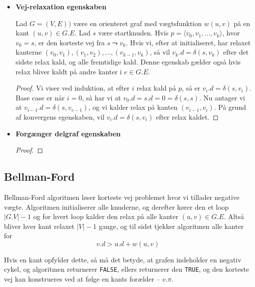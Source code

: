 \begin{itemize}
\item \textbf{Vej-relaxation egenskaben}
  \begin{lemma}
    Lad $G = (V,E))$ være en orienteret graf med vægtsfunktion $w(u,v)$ på en kant $(u,v) \in G.E$. Lad $s$ være startknuden. Hvis $p = \langle v_0, v_1, ..., v_k\rangle$, hvor $v_0 = s$, er den korteste vej fra $s \leadsto v_k$. Hvis vi, efter at initialiseret, har relaxet kanterne $(v_0, v_1), (v_1, v_2), ..., (v_{k-1}, v_k)$, så vil $v_k.d = \delta(s,v_k)$ efter det sidste relax kald, og alle fremtidige kald. Denne egenskab gælder også hvis relax bliver kaldt på andre kanter i $e \in G.E$.
  \end{lemma}

  \begin{proof}
    Vi viser ved induktion, at efter $i$ relax kald på $p$, så er $v_i.d = \delta(s,v_i)$.\\
    Base case er når $i=0$, så har vi at $v_0.d = s.d = 0 = \delta(s,s)$.
    Nu antager vi at $v_{i-1}.d = \delta(s, v_{v - 1})$, og vi kalder relax på kanten $(v_{i-1}, v_i)$. På grund af konvergens egenskaben, vil $v_i.d = \delta(s,v_i)$ efter relax kaldet.
  \end{proof}


\item\textbf{Forgænger delgraf egenskaben}
  \begin{lemma}
  \end{lemma}

  \begin{proof}
  \end{proof}

\end{itemize}

\subsection{Bellman-Ford}
Bellman-Ford algoritmen løser korteste vej problemet hvor vi tillader negative vægte. Algoritmen initialiserer alle knuderne, og derefter kører den et loop $|G.V| - 1$ og for hvert loop kalder den relax på alle kanter $(u,v) \in G.E$. Altså bliver hver kant relaxet $|V| - 1$ gange, og til sidst tjekker algoritmen alle kanter for
$$v.d > u.d + w(u,v)$$

Hvis en kant opfylder dette, så må det betyde, at grafen indeholder en negativ cykel, og algoritmen returnerer \texttt{FALSE}, ellers returnerer den \texttt{TRUE}, og den korteste vej kan konstrueres ved at følge en kants forælder -- $v.\pi$.\\

